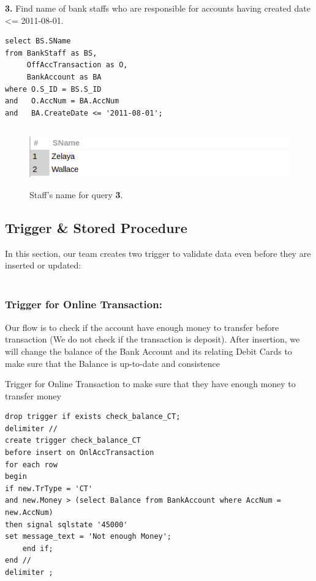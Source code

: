 \documentclass[12pt,a4paper]{article}
\begin{document}
\indent \textbf{3.} Find name of bank staffs who are responsible for accounts having created date <= 2011-08-01.
\begin{verbatim}
select BS.SName
from BankStaff as BS, 
     OffAccTransaction as O, 
     BankAccount as BA
where O.S_ID = BS.S_ID 
and   O.AccNum = BA.AccNum 
and   BA.CreateDate <= '2011-08-01';
 \end{verbatim}
 
    \begin{figure}[H]
        \centering
        \includegraphics[width=5in,height=1in]{Picture/data3.png}
        \caption{Staff's name for query \textbf{3}.}
    \end{figure}

\subsection{Trigger \& Stored Procedure}
\indent In this section, our team creates two trigger to validate data even before they are inserted or updated:\\\\
\subsubsection{Trigger for Online Transaction:}
Our flow is to check if the account have enough money to transfer before transaction (We do not check if the transaction is deposit). After insertion, we will change the balance of the Bank Account and its relating Debit Cards to make sure that the Balance is up-to-date and consistence

Trigger for Online Transaction to make sure that they have enough money to transfer money

\begin{verbatim}
drop trigger if exists check_balance_CT;
delimiter //
create trigger check_balance_CT 
before insert on OnlAccTransaction
for each row 
begin 
if new.TrType = 'CT' 
and new.Money > (select Balance from BankAccount where AccNum = new.AccNum) 
then signal sqlstate '45000' 
set message_text = 'Not enough Money';
	end if;
end //
delimiter ;
\end{verbatim}
\end{document}
